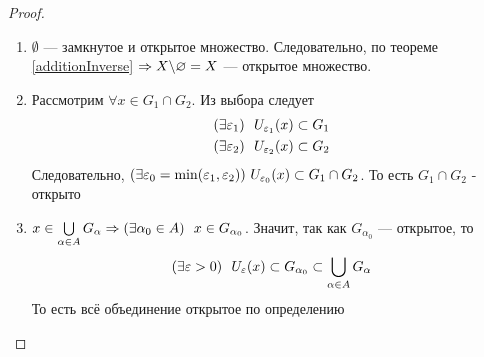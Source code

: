 \begin{proof}~
	\begin{enumerate}
		\item $\emptyset$ --- замкнутое и открытое множество.
			Следовательно, по теореме \ref{additionInverse}
			$\Rightarrow X \backslash \varnothing = X$ --- открытое множество.
		
		\item Рассмотрим $\forall x \in G_1 \cap G_2$. Из выбора следует
			\begin{align*}
				&(\exists \varepsilon_1)\ \ U_{\varepsilon_1}(x) \subset G_1
				\\
				&(\exists \varepsilon_2)\ \ U_{\varepsilon_2}(x) \subset G_2 
			\end{align*}
			Следовательно, $(\exists \eps_0 = \min(\eps_1, \eps_2))\ 
			U_{\eps_0}(x) \subset G_1 \cap G_2$. То есть $G_1 \cap G_2$ - открыто
		
		\item $x \in \bigcup\limits_{\alpha \in A} G_\alpha \Rightarrow
			(\exists \alpha_0 \in A)\ \ x \in G_{\alpha_0}$. Значит,
			так как $G_{\alpha_0}$ --- открытое, то
			\[
				(\exists \eps > 0)\ \ U_\eps(x) \subset G_{\alpha_0}
				\subset \bigcup\limits_{\alpha \in A} G_{\alpha}
			\]
			То есть всё объединение открытое по определению
	\end{enumerate}
\end{proof}